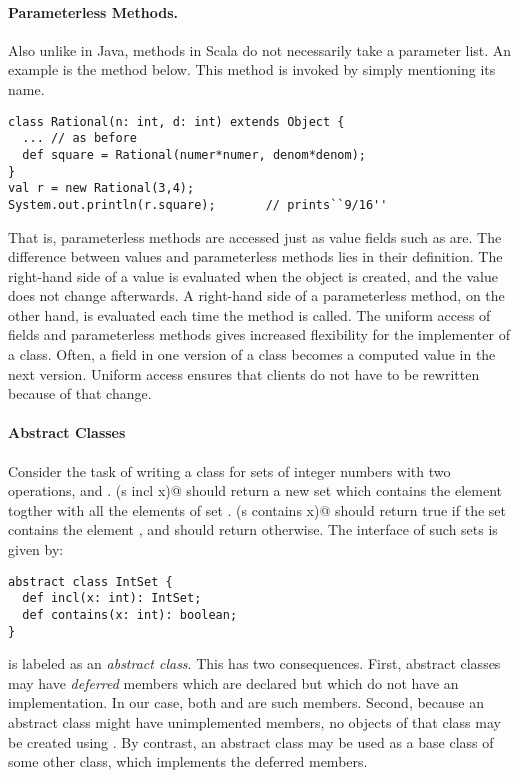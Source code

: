 \documentclass[11pt]{book}
\begin{document}
\paragraph{Parameterless Methods.}
Also unlike in Java, methods in Scala do not necessarily take a
parameter list. An example is the \verb@square@ method below. This
method is invoked by simply mentioning its name. 
\begin{verbatim}
class Rational(n: int, d: int) extends Object {
  ... // as before
  def square = Rational(numer*numer, denom*denom);
}
val r = new Rational(3,4);
System.out.println(r.square);		// prints``9/16''
\end{verbatim}
That is, parameterless methods are accessed just as value fields such
as \verb@numer@ are. The difference between values and parameterless
methods lies in their definition. The right-hand side of a value is
evaluated when the object is created, and the value does not change
afterwards. A right-hand side of a parameterless method, on the other
hand, is evaluated each time the method is called.  The uniform access
of fields and parameterless methods gives increased flexibility for
the implementer of a class. Often, a field in one version of a class
becomes a computed value in the next version. Uniform access ensures
that clients do not have to be rewritten because of that change.

\paragraph{Abstract Classes}

Consider the task of writing a class for sets of integer numbers with
two operations, \verb@incl@ and \verb@contains@. \verb@(s incl x)@
should return a new set which contains the element \verb@x@ togther
with all the elements of set \verb@s@. \verb@(s contains x)@ should
return true if the set \verb@s@ contains the element \verb@x@, and
should return \verb@false@ otherwise. The interface of such sets is
given by:  
\begin{verbatim}
abstract class IntSet {
  def incl(x: int): IntSet;
  def contains(x: int): boolean;
}
\end{verbatim}
\verb@IntSet@ is labeled as an \emph{abstract class}. This has two
consequences.  First, abstract classes may have {\em deferred} members
which are declared but which do not have an implementation. In our
case, both \verb@incl@ and \verb@contains@ are such members. Second,
because an abstract class might have unimplemented members, no objects
of that class may be created using \verb@new@. By contrast, an
abstract class may be used as a base class of some other class, which
implements the deferred members.
\end{document}
